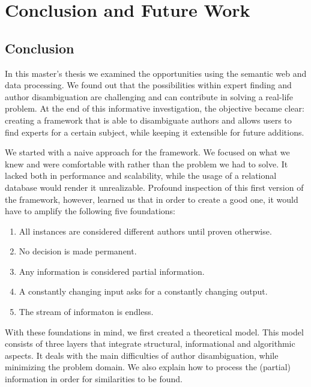 \chapter{Conclusion and Future Work}


\section{Conclusion}

In this master's thesis we examined the opportunities using the semantic web and data processing. We found out that the possibilities within expert finding and author disambiguation are challenging and can contribute in solving a real-life problem. At the end of this informative investigation, the objective became clear: creating a framework that is able to disambiguate authors and allows users to find experts for a certain subject, while keeping it extensible for future additions.


We started with a naive approach for the framework. We focused on what we knew and were comfortable with rather than the problem we had to solve. It lacked both in performance and scalability, while the usage of a relational database would render it unrealizable. Profound inspection of this first version of the framework, however, learned us that in order to create a good one, it would have to amplify the following five foundations:

\begin{enumerate}
	\item All instances are considered different authors until proven otherwise.
	\item No decision is made permanent.
	\item Any information is considered partial information.
	\item A constantly changing input asks for a constantly changing output.
	\item The stream of informaton is endless.
\end{enumerate}


With these foundations in mind, we first created a theoretical model. This model consists of three layers that integrate structural, informational and algorithmic aspects. It deals with the main difficulties of author disambiguation, while minimizing the problem domain. We also explain how to process the (partial) information in order for similarities to be found. 

